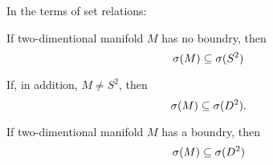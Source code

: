 In the terms of set relations:
\begin{observation}
If two-dimentional manifold $M$ has no boundry, then
\begin{equation} 
{{\sigma}(M)} \subseteq {{\sigma}(S^2)} 
\end{equation} 

If, in addition, $M \neq S^2$, then 
\begin{equation} 
{{\sigma}(M)} \subseteq {{\sigma}(D^2)}. 
\end{equation}

\end{observation}
\begin{observation}
If two-dimentional manifold  $M$ has a boundry, then 
\begin{equation}
{{\sigma}(M)} \subseteq {{\sigma}(D^2)}
\end{equation}
\end{observation}


